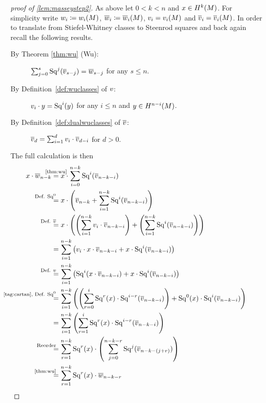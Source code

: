 \begin{proof}[proof of \autoref{lem:masseystep2}]
  As above let $0<k<n$ and $x\in H^k(M)$.
  For simplicity write
  $w_{i}\coloneqq{w_{i}}(M)$, $\overline{w}_{i}\coloneqq{\overline{w}_{i}}(M)$,
  $v_{i} = {v_{i}}(M)$ and $\overline{v}_{i} = {\overline{v}_{i}}(M)$.
  In order to translate from Stiefel-Whitney classes to Steenrod
  squares and back again recall the following results.
  \begin{description}
  \item[By Theorem \autoref{thm:wu} (Wu):]
    $\sum_{j=0}^{s} \mathrm{Sq}^{j}(\overline{v}_{s-j}) = \overline{w}_{s-j}$
    for any $s\leq n$.
  \item[By Definition~\autoref{def:wuclasses} of $v$:]
    $v_{i} \cdot y = \mathrm{Sq}^{i}(y)$
    for any $i\leq n$ and $y\in H^{n-i}(M)$.
  \item[By Definition~\autoref{def:dualwuclasses} of $\overline{v}$:]
    $\overline{v}_{d} = \sum_{i=1}^{d} v_{i}\cdot \overline{v}_{d-i}$ for $d>0$.
  \end{description}
  The full calculation is then
  \begin{align*}
    x\cdot \dualws{n-k}
    &\cequalsby{\autoref{thm:wu}}
      x\cdot \sum_{i=0}^{n-k} \Sq i(\dualvu{n-k-i}) \\
    &\equalsby{Def. $\Sq 0$}
      x\cdot\left(
      \dualvu{n-k} + \sum_{i=1}^{n-k} \Sq i(\dualvu{n-k-i})
      \right) \\
    &\equalsby{Def. $\dualVu$}
      x\cdot\left(
      \left(\sum_{i=1}^{n-k} \vu{i}\cdot\dualvu{n-k-i}\right)
      + \left(\sum_{i=1}^{n-k} \Sq i(\dualvu{n-k-i})\right)
      \right) \\
    &=
      \sum_{i=1}^{n-k} \left(
      \vu{i}\cdot x\cdot \dualvu{n-k-i}
      + x\cdot \Sq i(\dualvu{n-k-i})
      \right) \\
    &\equalsby{Def. $\Vu$}
      \sum_{i=1}^{n-k} \left(
      \Sq i (x\cdot \dualvu{n-k-i})
      + x\cdot \Sq i(\dualvu{n-k-i})
      \right) \\
    &\equalsby{\ref{tag:cartan}, Def. $\Sq 0$}
      \sum_{i=1}^{n-k} \left(
      \left( \sum_{r=0}^{i} \Sq r(x)\cdot \Sq{i-r}(\dualvu{n-k-i}) \right)
      + \Sq 0(x)\cdot \Sq i(\dualvu{n-k-i})
      \right) \\
    &=
      \sum_{i=1}^{n-k} \left(
      \sum_{r=1}^{i} \Sq r(x)\cdot \Sq{i-r}(\dualvu{n-k-i})
      \right) \\
    &\equalsby{Reorder}
      \sum_{r=1}^{n-k} \Sq r(x) \cdot
      \left( \sum_{j=0}^{n-k-r} \Sq j(\dualvu{n-k-(j+r)}) \right) \\
    &\equalsby{\autoref{thm:wu}}
      \sum_{r=1}^{n-k} \Sq r(x) \cdot\dualws{n-k-r}
      \qedhere
  \end{align*}
\end{proof}




